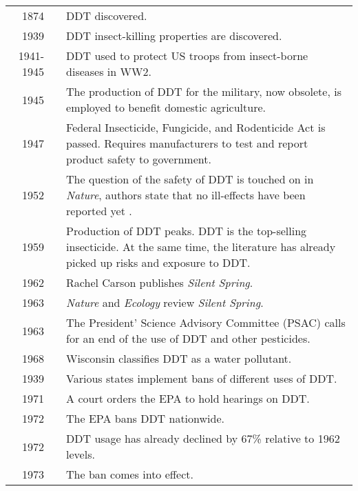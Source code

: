 \documentclass[convert, 12pt]{standalone}
\begin{document}
	\begin{tabularx}{\textwidth}{r @{\hspace{0.5\tabcolsep}} l |@{\hspace{-2.3pt}$\bullet$ \hspace{5pt}} X}
		\toprule

		1874 & & DDT discovered.\\

		1939 & & DDT insect-killing properties are discovered.\\

		1941-1945 & & DDT used to protect US troops from insect-borne diseases in WW2.\\

		1945 & & The production of DDT for the military, now obsolete, is employed to benefit domestic agriculture.\\

		1947 & & Federal Insecticide, Fungicide, and Rodenticide Act is passed. Requires manufacturers to test and report product safety to government.\\

		1952 & & The question of the safety of DDT is touched on in \textit{Nature}, authors state that no ill-effects have been reported yet \citep{Davidson1952}.\\
 
		1959 & & Production of DDT peaks. DDT is the top-selling insecticide. At the same time, the literature has already picked up risks and exposure to DDT.\\

		1962 & & Rachel Carson publishes \textit{Silent Spring}.\\

		1963 & & \textit{Nature} and \textit{Ecology} review \textit{Silent Spring}.\\

		1963 & & The President' Science Advisory Committee (PSAC) calls for an end of the use of DDT and other pesticides.\\

		1968 & & Wisconsin classifies DDT as a water pollutant.\\

		1939 & & Various states implement bans of different uses of DDT.\\

		1971 & & A court orders the EPA to hold hearings on DDT.\\

		1972 & & The EPA bans DDT nationwide.\\

		1972 & & DDT usage has already declined by 67\% relative to 1962 levels.\\

		1973 & & The ban comes into effect.\\

	\end{tabularx}
\end{document}
